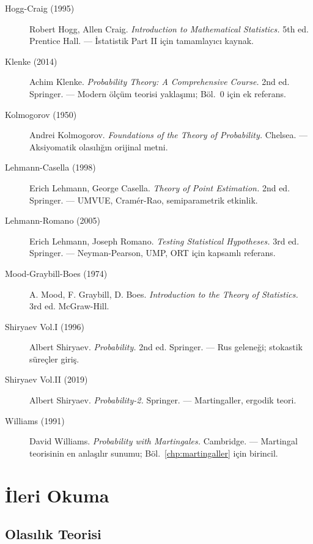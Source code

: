 \begin{description}
  \item[Hogg-Craig (1995)] Robert Hogg, Allen Craig. \textit{Introduction to Mathematical Statistics.} 5th ed. Prentice Hall. --- İstatistik Part II için tamamlayıcı kaynak.

  \item[Klenke (2014)] Achim Klenke. \textit{Probability Theory: A Comprehensive Course.} 2nd ed. Springer. --- Modern ölçüm teorisi yaklaşımı; Böl.~0 için ek referans.

  \item[Kolmogorov (1950)] Andrei Kolmogorov. \textit{Foundations of the Theory of Probability.} Chelsea. --- Aksiyomatik olasılığın orijinal metni.

  \item[Lehmann-Casella (1998)] Erich Lehmann, George Casella. \textit{Theory of Point Estimation.} 2nd ed. Springer. --- UMVUE, Cramér-Rao, semiparametrik etkinlik.

  \item[Lehmann-Romano (2005)] Erich Lehmann, Joseph Romano. \textit{Testing Statistical Hypotheses.} 3rd ed. Springer. --- Neyman-Pearson, UMP, ORT için kapsamlı referans.

  \item[Mood-Graybill-Boes (1974)] A. Mood, F. Graybill, D. Boes. \textit{Introduction to the Theory of Statistics.} 3rd ed. McGraw-Hill.

  \item[Shiryaev Vol.I (1996)] Albert Shiryaev. \textit{Probability.} 2nd ed. Springer. --- Rus geleneği; stokastik süreçler giriş.

  \item[Shiryaev Vol.II (2019)] Albert Shiryaev. \textit{Probability-2.} Springer. --- Martingaller, ergodik teori.

  \item[Williams (1991)] David Williams. \textit{Probability with Martingales.} Cambridge. --- Martingal teorisinin en anlaşılır sunumu; Böl.~\ref{chp:martingaller} için birincil.
\end{description}

\section{İleri Okuma}

\subsection{Olasılık Teorisi}

